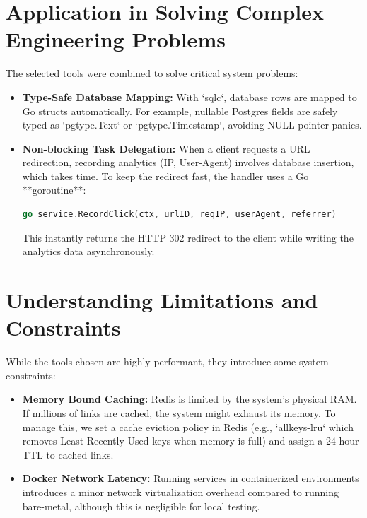 \section{Application in Solving Complex Engineering Problems}
The selected tools were combined to solve critical system problems:
\begin{itemize}
    \item \textbf{Type-Safe Database Mapping:} With `sqlc`, database rows are mapped to Go structs automatically. For example, nullable Postgres fields are safely typed as `pgtype.Text` or `pgtype.Timestamp`, avoiding NULL pointer panics.
    \item \textbf{Non-blocking Task Delegation:} When a client requests a URL redirection, recording analytics (IP, User-Agent) involves database insertion, which takes time. To keep the redirect fast, the handler uses a Go **goroutine**:
    \begin{lstlisting}[language=Go]
    go service.RecordClick(ctx, urlID, reqIP, userAgent, referrer)
    \end{lstlisting}
    This instantly returns the HTTP 302 redirect to the client while writing the analytics data asynchronously.
\end{itemize}

\section{Understanding Limitations and Constraints}
While the tools chosen are highly performant, they introduce some system constraints:
\begin{itemize}
    \item \textbf{Memory Bound Caching:} Redis is limited by the system's physical RAM. If millions of links are cached, the system might exhaust its memory. To manage this, we set a cache eviction policy in Redis (e.g., `allkeys-lru` which removes Least Recently Used keys when memory is full) and assign a 24-hour TTL to cached links.
    \item \textbf{Docker Network Latency:} Running services in containerized environments introduces a minor network virtualization overhead compared to running bare-metal, although this is negligible for local testing.
\end{itemize}

